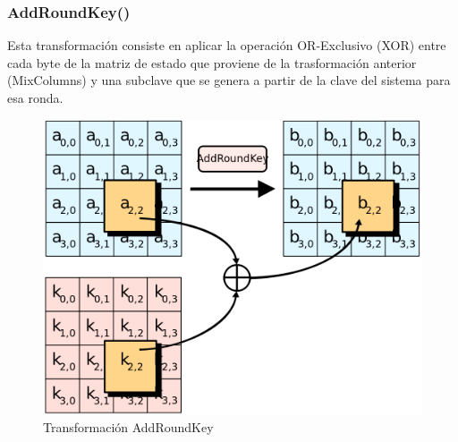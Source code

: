 \documentclass[peerreview]{IEEEtran}
\begin{document}
\subsubsection{AddRoundKey()}
Esta transformación consiste en aplicar la operación OR-Exclusivo (XOR) entre
cada byte de la matriz de estado que proviene de la trasformación anterior
(MixColumns) y una subclave que se genera a partir de la clave del sistema para
esa ronda.
\begin{figure}[h]
  \includegraphics[scale=0.2]{figuras/AddRoundKey.png}
  \centering
  \caption{Transformación AddRoundKey}
  \label{fig: 6}
\end{figure}
\end{document}
